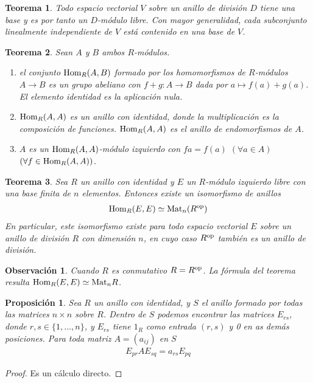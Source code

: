 \documentclass{report}
\newcommand{\Hom}{\textnormal{Hom}}
\newcommand{\Mat}{\textnormal{Mat}}
\newtheorem{theorem}{Teorema}
\newtheorem{proposition}{Proposición}
\newtheorem{remark}{Observación}
\begin{document}
  \begin{theorem}
    \label{theorem:vectorSpaceBasis}
    Todo espacio vectorial \(V\) sobre un anillo de división \(D\) tiene una base y es por tanto un \(D\)-módulo libre.
    Con mayor generalidad, cada subconjunto linealmente independiente de \(V\) está contenido en una base de \(V\).
  \end{theorem}

  \begin{theorem}
    \label{theorem:moduleHomomorphisms}
    Sean \(A\) y \(B\) ambos \(R\)-módulos.
    \begin{enumerate}
      \item el conjunto \(\Hom_R(A, B)\) formado por los homomorfismos de \(R\)-módulos \(A \rightarrow B\) es un grupo abeliano con \(f + g : A \rightarrow B\) dada por \(a \mapsto f(a) + g(a)\).
      El elemento identidad es la aplicación nula.
      \item \(\Hom_R(A, A)\) es un anillo con identidad, donde la multiplicación es la composición de funciones.
      \(\Hom_R(A, A)\) es el \emph{anillo de endomorfismos} de \(A\).
      \item \(A\) es un \(\Hom_R(A, A)\)-módulo izquierdo con \(f a = f(a)\) \((\forall a \in A)\) \((\forall f \in \Hom_R(A, A))\).
    \end{enumerate}
  \end{theorem}

  \begin{theorem}
    \label{theorem:isomorphismBetweenMatrixAndHomomorphismRings}
    Sea \(R\) un anillo con identidad y \(E\) un \(R\)-módulo izquierdo libre con una base finita de \(n\) elementos.
    Entonces existe un isomorfismo de anillos
    \begin{align}
      \Hom_R(E, E)
      \simeq
      \Mat_n(R^{\textnormal{op}})
    \end{align}
    En particular, este isomorfismo existe para todo espacio vectorial \(E\) sobre un anillo de división \(R\) con dimensión \(n\), en cuyo caso \(R^{\textnormal{op}}\) también es un anillo de división.
  \end{theorem}
  \begin{remark}
    Cuando \(R\) es conmutativo \(R = R^{\textnormal{op}}\).
    La fórmula del teorema resulta \(\Hom_R(E, E) \simeq \Mat_n R\).
  \end{remark}

  \begin{proposition}
    Sea \(R\) un anillo con identidad, y \(S\) el anillo formado por todas las matrices \(n \times n\) sobre \(R\).
    Dentro de \(S\) podemos encontrar las matrices \(E_{r s}\), donde \(r, s \in \{1, \dots, n\}\), y \(E_{r s}\) tiene \(1_R\) como entrada \((r, s)\) y 0 en as demás posiciones.
    Para toda matriz \(A = (a_{i j})\) en \(S\)
    \begin{align}
      E_{p r} A E_{s q}
      =
      a_{r s} E_{p q}
    \end{align}
  \end{proposition}
  \begin{proof}
    Es un cálculo directo.
  \end{proof}
\end{document}

